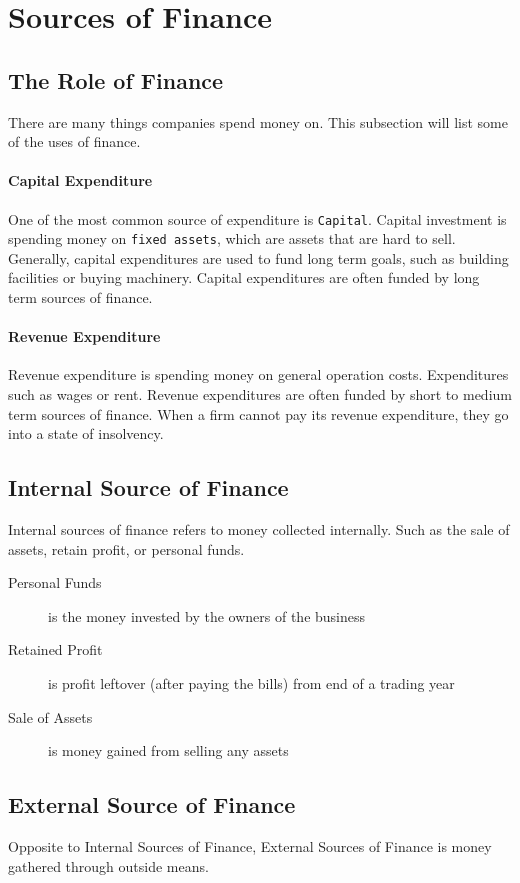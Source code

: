 \documentclass{standalone}
\begin{document}
\section{Sources of Finance}

\subsection{The Role of Finance}
There are many things companies spend money on. 
This subsection will list some of the uses of finance.

\paragraph{Capital Expenditure}
One of the most common source of expenditure is \texttt{Capital}.
Capital investment is spending money on \texttt{fixed assets}, which are assets that are hard to sell.
Generally, capital expenditures are used to fund long term goals, such as building facilities or buying machinery.
Capital expenditures are often funded by long term sources of finance.

\paragraph{Revenue Expenditure}
Revenue expenditure is spending money on general operation costs.
Expenditures such as wages or rent.
Revenue expenditures are often funded by short to medium term sources of finance.
When a firm cannot pay its revenue expenditure, they go into a state of insolvency.

\subsection{Internal Source of Finance}
Internal sources of finance refers to money collected internally.
Such as the sale of assets, retain profit, or personal funds.

\begin{description}
    \item[Personal Funds] is the money invested by the owners of the business
    \item[Retained Profit] is profit leftover (after paying the bills) from end of a trading year
    \item[Sale of Assets] is money gained from selling any assets
\end{description}

\subsection{External Source of Finance}
Opposite to Internal Sources of Finance, External Sources of Finance is money gathered through outside means.
\end{document}
